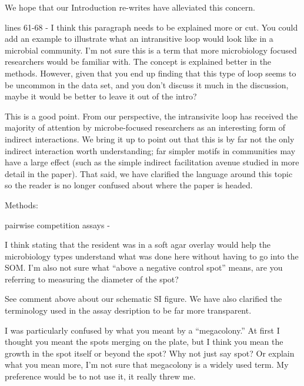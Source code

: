 \documentclass[11pt,]{article}
\begin{document}
We hope that our Introduction re-writes have alleviated this concern.

\begin{blockquote}
lines 61-68 - I think this paragraph needs to be explained more or cut.
You could add an example to illustrate what an intransitive loop would
look like in a microbial community. I'm not sure this is a term that
more microbiology focused researchers would be familiar with. The
concept is explained better in the methods. However, given that you end
up finding that this type of loop seems to be uncommon in the data set,
and you don't discuss it much in the discussion, maybe it would be
better to leave it out of the intro?
\end{blockquote}

This is a good point. From our perspective, the intransivite loop has
received the majority of attention by microbe-focused researchers as an
interesting form of indirect interactions. We bring it up to point out
that this is by far not the only indirect interaction worth
understanding; far simpler motifs in communities may have a large effect
(such as the simple indirect facilitation avenue studied in more detail
in the paper). That said, we have clarified the language around this
topic so the reader is no longer confused about where the paper is
headed.

\begin{blockquote}
Methods:
\end{blockquote}

\begin{blockquote}
pairwise competition assays -
\end{blockquote}

\begin{blockquote}
I think stating that the resident was in a soft agar overlay would help
the microbiology types understand what was done here without having to
go into the SOM. I'm also not sure what ``above a negative control
spot'' means, are you referring to measuring the diameter of the spot?
\end{blockquote}

See comment above about our schematic SI figure. We have also clarified
the terminology used in the assay desription to be far more transparent.

\begin{blockquote}
I was particularly confused by what you meant by a ``megacolony.'' At
first I thought you meant the spots merging on the plate, but I think
you mean the growth in the spot itself or beyond the spot? Why not just
say spot? Or explain what you mean more, I'm not sure that megacolony is
a widely used term. My preference would be to not use it, it really
threw me.
\end{blockquote}
\end{document}
